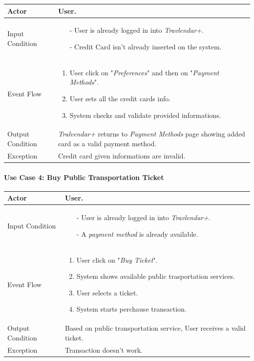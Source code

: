 		\begin{tabular}{| l | p{} | }
			\hline
			\hline
			Actor	&		User. \\
			\hline
			Input Condition		&		\begin{itemize}
													\item[-] User is already logged in into \textit{Travlendar+}.
													\item[-] Credit Card isn't already inserted on the system.
												\end{itemize} \\
			\hline
			Event Flow		&		\begin{enumerate}
												\item User click on "\textit{Preferences}" and then on "\textit{Payment Methods}".
												\item User sets all the credit cards info.
												\item System checks and validate provided informations.
											\end{enumerate} \\
			\hline
			Output Condition		&		\textit{Tralvendar+} returns to \textit{Payment Methods} page showing added card as a valid payment method. \\
			\hline		
			Exception		&		Credit card given informations are invalid. \\
			\hline
			\hline
		\end{tabular}


	\paragraph{Use Case 4: Buy Public Transportation Ticket}
	
		\begin{tabular}{| l | p{} | }
			\hline
			\hline
			Actor	&		User. \\
			\hline
			Input Condition		&		\begin{itemize}
													\item[-] User is already logged in into \textit{Travlendar+}.
													\item[-] A \textit{payment method} is already available.
												\end{itemize} \\
			\hline
			Event Flow		&		\begin{enumerate}
												\item User click on "\textit{Buy Ticket}".
												\item System shows available public trasportation services.
												\item User selects a ticket.
												\item	 System starts perchause transaction.
											\end{enumerate} \\
			\hline
			Output Condition		&		Based on public transportation service, User receives a valid ticket. \\
			\hline		
			Exception		&		Transaction doesn't work. \\
			\hline
			\hline
		\end{tabular}

